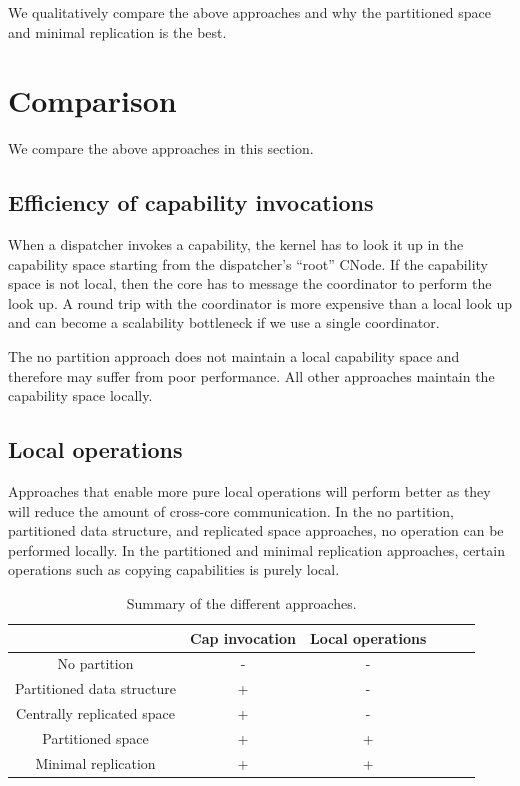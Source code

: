\documentclass[a4paper,twoside]{report} %
\begin{document}
We qualitatively compare the above approaches and why the partitioned
space and minimal replication is the best.

\section{Comparison}\label{sec:comparison}
We compare the above approaches in this section.

\subsection{Efficiency of capability invocations}
When a dispatcher invokes a capability, the kernel has to look it up
in the capability space starting from the dispatcher's ``root'' CNode.
If the capability space is not local, then the core has to message the
coordinator to perform the look up. A round trip with the coordinator
is more expensive than a local look up and can become a scalability
bottleneck if we use a single coordinator.

The no partition approach does not maintain a local capability space
and therefore may suffer from poor performance. All other approaches
maintain the capability space locally.

\subsection{Local operations}
Approaches that enable more pure local operations will perform better
as they will reduce the amount of cross-core communication. In the no
partition, partitioned data structure, and replicated space
approaches, no operation can be performed locally. In the partitioned
and minimal replication approaches, certain operations such as copying
capabilities is purely local.

\begin{table}
\begin{center}
\begin{tabular}{|c|c|c|c|c|c|}
  \hline

  & Cap invocation & Local operations \\
  \hline

  No partition                & - & -   \\ \hline
  Partitioned data structure  & + & -   \\ \hline
  Centrally replicated space  & + & -   \\ \hline
  Partitioned space           & + & +   \\ \hline
  Minimal replication         & + & +   \\ \hline

\end{tabular}
\end{center}
\caption{\label{t:summary}Summary of the different approaches.}
\end{table}
\end{document}
